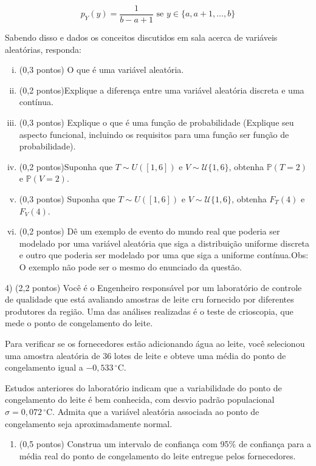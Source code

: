 \documentclass[12pt]{article}
\begin{document}
\begin{enumerate}[a)]
\begin{enumerate}[a)]
    $$p_{Y}(y) = \dfrac{1}{b-a+1}  \text{ se } y \in \{a, a+1, \dots, b\}$$

    Sabendo disso e dados os conceitos discutidos em sala acerca de variáveis aleatórias, responda:
    \begin{enumerate}[i)]
        \item(0,3 pontos) O que é uma variável aleatória. 
        \item(0,2 pontos)Explique a diferença entre uma variável aleatória discreta e uma contínua.
        \item (0,3 pontos) Explique o que é uma função de probabilidade (Explique seu aspecto funcional, incluindo os requisitos para uma função ser função de probabilidade).
        \item (0,2 pontos)Suponha que $T \sim U([1,6])$ e  $V \sim \mathcal{U}\{1,6\}$, obtenha $\mathds{P}(T=2)$ e $\mathds{P}(V=2)$.
        \item (0,3 pontos) Suponha que $T \sim U([1,6])$ e  $V \sim \mathcal{U}\{1,6\}$, obtenha $F_T(4)$ e $F_{V}(4)$.
        \item (0,2 pontos) Dê um exemplo de evento do mundo real que poderia ser modelado por uma variável aleatória que siga a distribuição uniforme discreta e outro que poderia ser modelado por uma que siga a uniforme contínua.Obs: O exemplo não pode ser o mesmo do enunciado da questão.
    \end{enumerate}
\end{enumerate}

\vspace{5px}
4) (2,2 pontos) Você é o Engenheiro responsável por um laboratório de controle de qualidade que está avaliando amostras de leite cru fornecido por diferentes
 produtores da região. Uma das análises realizadas é o teste de crioscopia, que mede o ponto de congelamento do leite. 

Para verificar se os fornecedores estão adicionando água ao leite, você selecionou uma amostra aleatória de 36 lotes de leite e obteve uma média do ponto de 
congelamento igual a \( -0{,}533\,^\circ\mathrm{C} \).

Estudos anteriores do laboratório indicam que a variabilidade do ponto de congelamento do leite é bem conhecida, com desvio padrão populacional  $\sigma = 0{,}072\,^\circ\mathrm{C}$.
Admita que a variável aleatória associada ao ponto de congelamento seja aproximadamente normal.

\begin{enumerate}
    \item(0,5 pontos) Construa um intervalo de confiança com 95\% de confiança para a média real do ponto de congelamento do leite entregue pelos fornecedores.


\end{enumerate}
\end{enumerate}
\end{document}
